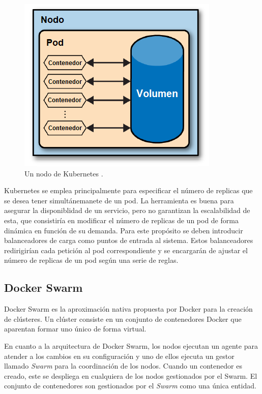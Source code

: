 \documentclass[11pt,spanish,listoffigures]{tfgetsinf}
\begin{document}
\begin{figure}[h]
\centering
\includegraphics[scale=0.9]{kubernetes_ES}
\caption{Un nodo de Kubernetes \cite{Rensin2015}.}
\label{fig:kubernetes_ES}
\end{figure}

Kubernetes se emplea principalmente para especificar el número de replicas que se desea tener simultánemanete de un pod. La herramienta es buena para asegurar la disponiblidad de un servicio, pero no garantizan la escalabilidad de esta, que consistiría en modificar el número de replicas de un pod de forma dinámica en función de su demanda. Para este propósito se deben introducir balanceadores de carga como puntos de entrada al sistema. Estos balanceadores redirigirían cada petición al pod correspondiente y se encargarán de ajustar el número de replicas de un pod según una serie de reglas.

\subsection{Docker Swarm}

Docker Swarm \cite{DeAlfonso2017} es la aproximación nativa propuesta por Docker para la creación de clústeres. Un clúster consiste en un conjunto de contenedores Docker que aparentan formar uno único de forma virtual.

En cuanto a la arquitectura de Docker Swarm, los nodos ejecutan un agente para atender a los cambios en su configuración y uno de ellos ejecuta un gestor llamado \textit{Swarm} para la coordinación de los nodos. Cuando un contenedor es creado, este se despliega en cualquiera de los nodos gestionados por el Swarm. El conjunto de contenedores son gestionados por el \textit{Swarm} como una única entidad.
\end{document}
